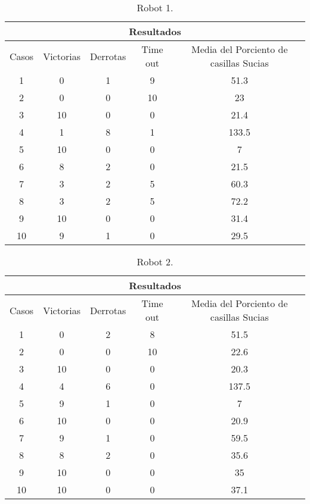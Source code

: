 \documentclass[12pt]{article}
\begin{document}
\begin{itemize}
			\begin{table}[htb]
			\centering
			\begin{tabular}{|c|c|c|c|c|}
			\hline
			\multicolumn{5}{|c|}{Resultados} \\ \hline
			Casos & Victorias & Derrotas & Time out & Media del Porciento de casillas Sucias \\
			\hline
			1 & 0 & 1 & 9 & 51.3 \\
			\hline
			2 & 0 & 0 & 10 & 23 \\
			\hline
			3 & 10 & 0 & 0 & 21.4 \\ 
			\hline
			4 & 1 & 8 & 1 & 133.5 \\
			\hline
			5 & 10 & 0 & 0 & 7 \\
			\hline
			6 & 8 & 2 & 0 & 21.5 \\
			\hline
			7 & 3 & 2 & 5 & 60.3 \\
			\hline
			8 & 3 & 2 & 5 & 72.2 \\
			\hline
			9 & 10 & 0 & 0 & 31.4 \\
			\hline
			10 & 9 & 1 & 0 & 29.5 \\
			\hline
			\end{tabular}
			\caption{Robot 1.}
			\label{tabla:sencilla2}
			\end{table}

			\begin{table}[htb]
			\centering
			\begin{tabular}{|c|c|c|c|c|}
			\hline
			\multicolumn{5}{|c|}{Resultados} \\ \hline
			Casos & Victorias & Derrotas & Time out & Media del Porciento de casillas Sucias \\
			\hline
			1 & 0 & 2 & 8 & 51.5 \\
			\hline
			2 & 0 & 0 & 10 & 22.6 \\
			\hline
			3 & 10 & 0 & 0 & 20.3 \\
			\hline
			4 & 4 & 6 & 0 & 137.5 \\
			\hline
			5 & 9 & 1 & 0 & 7 \\
			\hline
			6 & 10 & 0 & 0 & 20.9 \\
			\hline
			7 & 9 & 1 & 0 & 59.5 \\
			\hline
			8 & 8 & 2 & 0 & 35.6 \\
			\hline
			9 & 10 & 0 & 0 & 35 \\
			\hline
			10 & 10 & 0 & 0 & 37.1 \\
			\hline
			\end{tabular}
			\caption{Robot 2.}
			\label{tabla:sencilla2}
			\end{table}

		
	\end{itemize}
\end{document}
